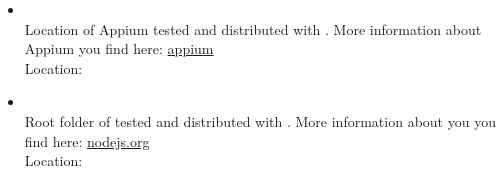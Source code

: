 \begin{itemize}
   \item {}\\
         Location of Appium tested and distributed with \rfw. More information about Appium you find here:
         \href{https://appium.io/}{appium}\\
         Location: 

   \item {}\\
         Root folder of  tested and distributed with \rfw. More information about  you you find here:
         \href{https://nodejs.org/en/}{nodejs.org}\\
         Location: 

\end{itemize}
